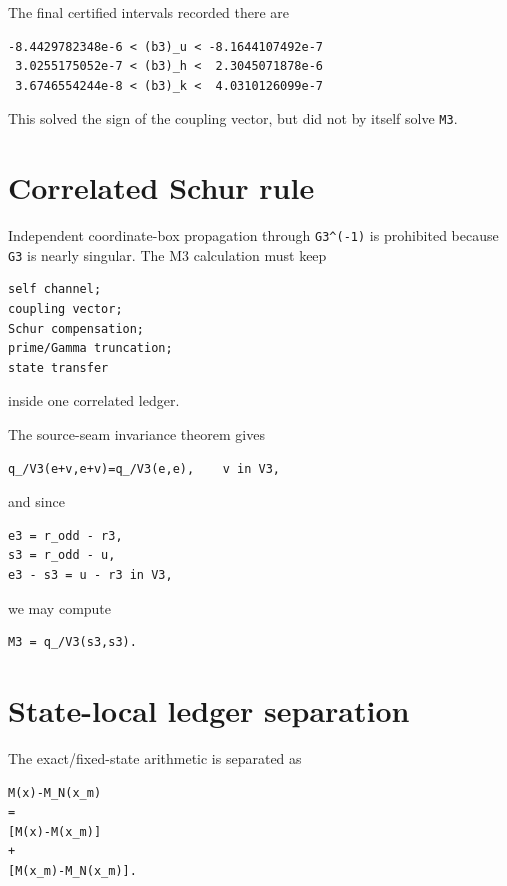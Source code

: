 The final certified intervals recorded there are

\begin{verbatim}
-8.4429782348e-6 < (b3)_u < -8.1644107492e-7
 3.0255175052e-7 < (b3)_h <  2.3045071878e-6
 3.6746554244e-8 < (b3)_k <  4.0310126099e-7
\end{verbatim}

This solved the sign of the coupling vector, but did not by itself solve \texttt{M3}.

\hypertarget{correlated-schur-rule}{%
\section{Correlated Schur rule}\label{correlated-schur-rule}}

Independent coordinate-box propagation through \texttt{G3\^{}(-1)} is prohibited because \texttt{G3} is nearly singular. The M3 calculation must keep

\begin{verbatim}
self channel;
coupling vector;
Schur compensation;
prime/Gamma truncation;
state transfer
\end{verbatim}

inside one correlated ledger.

The source-seam invariance theorem gives

\begin{verbatim}
q_/V3(e+v,e+v)=q_/V3(e,e),    v in V3,
\end{verbatim}

and since

\begin{verbatim}
e3 = r_odd - r3,
s3 = r_odd - u,
e3 - s3 = u - r3 in V3,
\end{verbatim}

we may compute

\begin{verbatim}
M3 = q_/V3(s3,s3).
\end{verbatim}

\hypertarget{state-local-ledger-separation}{%
\section{State-local ledger separation}\label{state-local-ledger-separation}}

The exact/fixed-state arithmetic is separated as

\begin{verbatim}
M(x)-M_N(x_m)
=
[M(x)-M(x_m)]
+
[M(x_m)-M_N(x_m)].
\end{verbatim}

